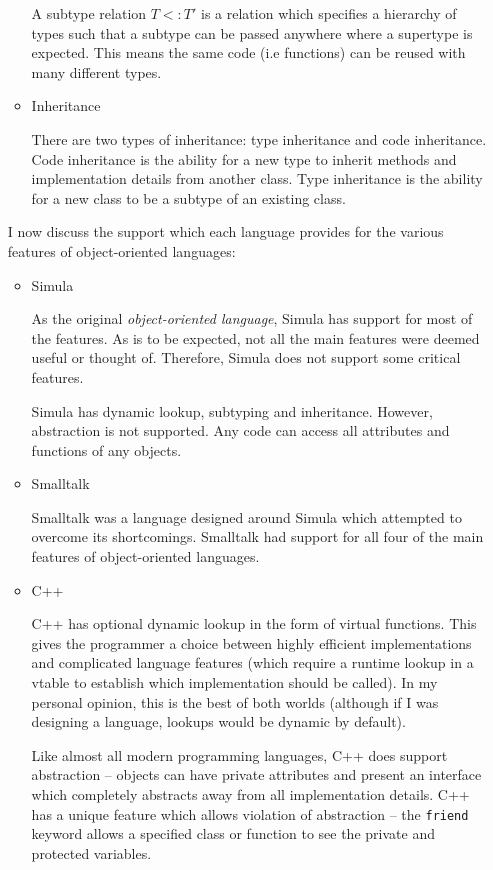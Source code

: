 \documentclass[10pt,\jkfside,a4paper]{article}
\begin{document}
\begin{enumerate}
\begin{itemize}
A subtype relation $T <: T'$ is a relation which specifies a hierarchy of
types such that a subtype can be passed anywhere where a supertype is
expected. This means the same code (i.e functions) can be reused with many
different types.

\item Inheritance

There are two types of inheritance: type inheritance and code inheritance.
Code inheritance is the ability for a new type to inherit methods and
implementation details from another class. Type inheritance is the ability
for a new class to be a subtype of an existing class.

\end{itemize}

I now discuss the support which each language provides for the various
features of object-oriented languages:
\begin{itemize}

\item Simula

As the original \textit{object-oriented language}, Simula has support for
most of the features. As is to be expected, not all the main features were
deemed useful or thought of. Therefore, Simula does not support some
critical features.

Simula has dynamic lookup, subtyping and inheritance. However, abstraction
is not supported. Any code can access all attributes and functions of any
objects.

\item Smalltalk

Smalltalk was a language designed around Simula which attempted to overcome
its shortcomings. Smalltalk had support for all four of the main
features of object-oriented languages.

\item C++

C++ has optional dynamic lookup in the form of virtual functions. This gives
the programmer a choice between highly efficient implementations and
complicated language features (which require a runtime lookup in a vtable to
establish which implementation should be called). In my personal opinion, this
is the best of both worlds (although if I was designing a language,
lookups would be dynamic by default).

Like almost all modern programming languages, C++ does support abstraction
-- objects can have private attributes and present an interface which
completely abstracts away from all implementation details. C++ has a unique
feature which allows violation of abstraction -- the \texttt{friend} keyword
allows a specified class or function to see the private and protected
variables.


\end{itemize}
\end{enumerate}
\end{document}
